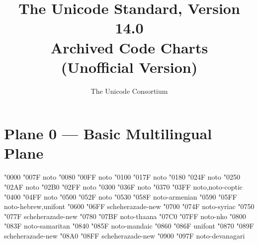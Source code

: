 \documentclass{article}
\title{The Unicode Standard, Version 14.0\\
  Archived Code Charts\\
  (Unofficial Version)}
\author{The Unicode Consortium}
\begin{document}
\maketitle
\tableofcontents

\section{Plane 0 --- Basic Multilingual Plane}

                        {  "0000} {  "007F} {noto}
                 {  "0080} {  "00FF} {noto}
                                   {  "0100} {  "017F} {noto}
                                   {  "0180} {  "024F} {noto}
                                     {  "0250} {  "02AF} {noto}
                           {  "02B0} {  "02FF} {noto}
                        {  "0300} {  "036F} {noto}
                                   {  "0370} {  "03FF} {noto,noto-coptic}
                                           {  "0400} {  "04FF} {noto}
                                {  "0500} {  "052F} {noto}
                                           {  "0530} {  "058F} {noto-armenian}
                                             {  "0590} {  "05FF} {noto-hebrew,unifont}
                                             {  "0600} {  "06FF} {scheherazade-new}
                                             {  "0700} {  "074F} {noto-syriac}
                                  {  "0750} {  "077F} {scheherazade-new}
                                             {  "0780} {  "07BF} {noto-thaana}
                                                {  "07C0} {  "07FF} {noto-nko}
                                          {  "0800} {  "083F} {noto-samaritan}
                                            {  "0840} {  "085F} {noto-mandaic}
                                  {  "0860} {  "086F} {unifont}
                                  {  "0870} {  "089F} {scheherazade-new}
                                  {  "08A0} {  "08FF} {scheherazade-new}
                                         {  "0900} {  "097F} {noto-devanagari}
\end{document}
